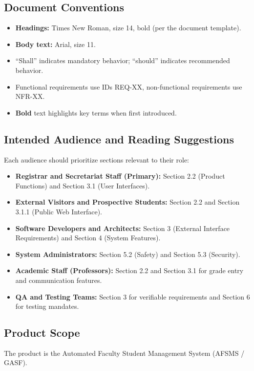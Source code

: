 \documentclass[11pt, a4paper]{article}
\begin{document}
\subsection{Document Conventions}
\begin{itemize}
    \item \textbf{Headings:} Times New Roman, size 14, bold (per the document template).
    \item \textbf{Body text:} Arial, size 11.
    \item ``Shall'' indicates mandatory behavior; ``should'' indicates recommended behavior.
    \item Functional requirements use IDs REQ-XX, non-functional requirements use NFR-XX.
    \item \textbf{Bold} text highlights key terms when first introduced.
\end{itemize}

\subsection{Intended Audience and Reading Suggestions}
Each audience should prioritize sections relevant to their role:
\begin{itemize}
    \item \textbf{Registrar and Secretariat Staff (Primary):} Section 2.2 (Product Functions) and Section 3.1 (User Interfaces).
    \item \textbf{External Visitors and Prospective Students:} Section 2.2 and Section 3.1.1 (Public Web Interface).
    \item \textbf{Software Developers and Architects:} Section 3 (External Interface Requirements) and Section 4 (System Features).
    \item \textbf{System Administrators:} Section 5.2 (Safety) and Section 5.3 (Security).
    \item \textbf{Academic Staff (Professors):} Section 2.2 and Section 3.1 for grade entry and communication features.
    \item \textbf{QA and Testing Teams:} Section 3 for verifiable requirements and Section 6 for testing mandates.
\end{itemize}

\subsection{Product Scope}
The product is the Automated Faculty Student Management System (AFSMS / GASF).
\end{document}
